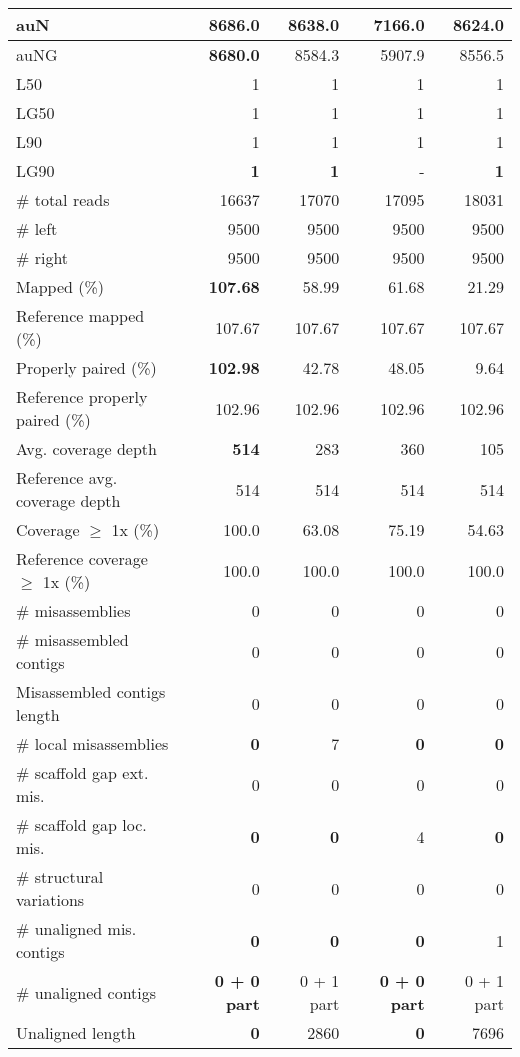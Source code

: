 \documentclass[12pt,a4paper]{article}
\begin{document}
\begin{table}[ht]
\begin{center}
\begin{tabular}{|l*{4}{|r}|}
auN & {\bf 8686.0} & 8638.0 & 7166.0 & 8624.0 \\ \hline
auNG & {\bf 8680.0} & 8584.3 & 5907.9 & 8556.5 \\ \hline
L50 & 1 & 1 & 1 & 1 \\ \hline
LG50 & 1 & 1 & 1 & 1 \\ \hline
L90 & 1 & 1 & 1 & 1 \\ \hline
LG90 & {\bf 1} & {\bf 1} & - & {\bf 1} \\ \hline
\# total reads & 16637 & 17070 & 17095 & 18031 \\ \hline
\# left & 9500 & 9500 & 9500 & 9500 \\ \hline
\# right & 9500 & 9500 & 9500 & 9500 \\ \hline
Mapped (\%) & {\bf 107.68} & 58.99 & 61.68 & 21.29 \\ \hline
Reference mapped (\%) & 107.67 & 107.67 & 107.67 & 107.67 \\ \hline
Properly paired (\%) & {\bf 102.98} & 42.78 & 48.05 & 9.64 \\ \hline
Reference properly paired (\%) & 102.96 & 102.96 & 102.96 & 102.96 \\ \hline
Avg. coverage depth & {\bf 514} & 283 & 360 & 105 \\ \hline
Reference avg. coverage depth & 514 & 514 & 514 & 514 \\ \hline
Coverage $\geq$ 1x (\%) & 100.0 & 63.08 & 75.19 & 54.63 \\ \hline
Reference coverage $\geq$ 1x (\%) & 100.0 & 100.0 & 100.0 & 100.0 \\ \hline
\# misassemblies & 0 & 0 & 0 & 0 \\ \hline
\# misassembled contigs & 0 & 0 & 0 & 0 \\ \hline
Misassembled contigs length & 0 & 0 & 0 & 0 \\ \hline
\# local misassemblies & {\bf 0} & 7 & {\bf 0} & {\bf 0} \\ \hline
\# scaffold gap ext. mis. & 0 & 0 & 0 & 0 \\ \hline
\# scaffold gap loc. mis. & {\bf 0} & {\bf 0} & 4 & {\bf 0} \\ \hline
\# structural variations & 0 & 0 & 0 & 0 \\ \hline
\# unaligned mis. contigs & {\bf 0} & {\bf 0} & {\bf 0} & 1 \\ \hline
\# unaligned contigs & {\bf 0 + 0 part} & 0 + 1 part & {\bf 0 + 0 part} & 0 + 1 part \\ \hline
Unaligned length & {\bf 0} & 2860 & {\bf 0} & 7696 \\ \hline

\end{tabular}
\end{center}
\end{table}
\end{document}
